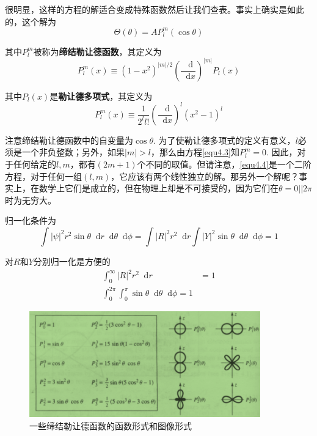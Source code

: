 \documentclass[UTF8]{ctexart}
\begin{document}
\noindent 很明显，这样的方程的解适合变成特殊函数然后让我们查表。事实上确实是如此的，这个解为
\begin{equation}
    \Theta(\theta) = A P_l^m (\cos \theta)
\end{equation}

\noindent 其中$P_l^m$被称为\textbf{缔结勒让德函数}，其定义为
\begin{equation}
    P_{l}^{m}(x) \equiv\left(1-x^{2}\right)^{|m| / 2}\left(\frac{\mathop{}\!\mathrm{d} }{\mathop{}\!\mathrm{d}  x}\right)^{|m|} P_{l}(x) \label{equ4.3}
    \end{equation}

\noindent 其中$P_l(x)$是\textbf{勒让德多项式}，其定义为
\begin{equation}
    P_l^m(x) \equiv \frac{1}{2^l l!} \left(\frac{\mathop{}\!\mathrm{d} }{\mathop{}\!\mathrm{d} x} \right)^l (x^2-1)^l
\end{equation}

    注意缔结勒让德函数中的自变量为$\cos \theta$. 为了使勒让德多项式的定义有意义，$l$必须是一个非负整数；另外，如果$|m| > l$，那么由方程\autoref{equ4.3}知$P_l^m=0$. 因此，对于任何给定的$l,m$，都有$(2m +1)$个不同的取值。但请注意，\autoref{equ4.4}是一个二阶方程，对于任何一组$(l,m)$，它应该有两个线性独立的解。那另外一个解呢？事实上，在数学上它们是成立的，但在物理上却是不可接受的，因为它们在$\theta = 0 || 2 \pi $时为无穷大。

    归一化条件为
    \begin{equation}
        \int |\psi|^2 r^2 \sin \theta \mathop{}\!\mathrm{d} r \mathop{}\!\mathrm{d} \theta \mathop{}\!\mathrm{d} \phi = \int |R|^2 r^2 \mathop{}\!\mathrm{d} r \int |Y|^2 \sin \theta \mathop{}\!\mathrm{d} \theta \mathop{}\!\mathrm{d} \phi = 1
    \end{equation}

\noindent 对$R$和$Y$分别归一化是方便的
\begin{equation}
    \begin{aligned}
        \int_0^{\infty} |R|^2 r^2 \mathop{}\!\mathrm{d} r&=1 \\
        \int_{0}^{2 \pi} \int_{0}^{\pi} \sin \theta \mathop{}\!\mathrm{d} \theta \mathop{}\!\mathrm{d} \phi = 1   
    \end{aligned}
\end{equation}

    \begin{figure}[htb]
        \centering
        \includegraphics[width=10cm]{figure4-1.png}
        \caption{一些缔结勒让德函数的函数形式和图像形式}
        \label{figure4.1}
    \end{figure}
\end{document}
